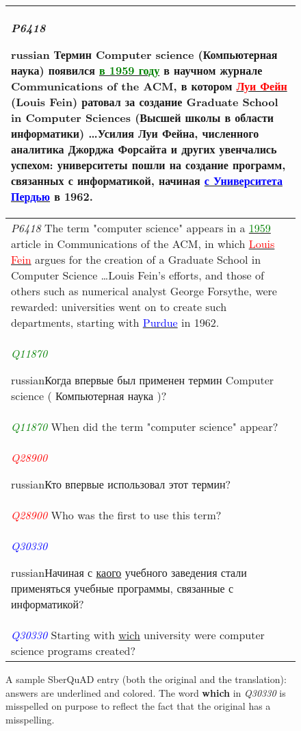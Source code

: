 \begin{figure*}[ht]
\begin{center}
\small
    \begin{tabular}{p{16cm}}
\textit{P6418} \begin{otherlanguage*}{russian} Термин Computer science (Компьютерная наука) появился \underline{\textcolor{green}{в 1959 году}} в научном журнале Communications of the ACM, в котором \underline{\textcolor{red}{Луи Фейн}} (Louis Fein) ратовал за создание Graduate School in Computer Sciences (Высшей школы в области информатики) \ldots Усилия Луи Фейна, численного аналитика Джорджа Форсайта и других увенчались успехом: университеты пошли на создание программ, связанных с информатикой, начиная \underline{\textcolor{blue}{с Университета Пердью}} в 1962. \end{otherlanguage*}   \\\hline
\textit{P6418} The term "computer science" appears in a \underline{\textcolor{green}{1959}} article in Communications of the ACM, 
in which \underline{\textcolor{red}{Louis Fein}} argues for the creation of a Graduate School in Computer Science \ldots   Louis Fein's efforts, and those of others such as numerical analyst George Forsythe, were rewarded: universities went on to create such departments, starting with \underline{\textcolor{blue}{Purdue}} in 1962.
 \\\hline 
\textit{\textcolor{green}{Q11870}} \begin{otherlanguage*}{russian}Когда впервые был применен термин Computer science ( Компьютерная наука )? \end{otherlanguage*}\\
\textit{\textcolor{green}{Q11870}} When did the term "computer science" appear? \\\hline
\textit{\textcolor{red}{Q28900}} \begin{otherlanguage*}{russian}Кто впервые использовал этот термин?\end{otherlanguage*} \\
\textit{\textcolor{red}{Q28900}} Who was the first to use this term? \\\hline
\textit{\textcolor{blue}{Q30330}} \begin{otherlanguage*}{russian}Начиная с \underline{каого} учебного заведения стали применяться учебные программы, связанные с информатикой?\end{otherlanguage*}\\
\textit{\textcolor{blue}{Q30330}} Starting with \underline{wich} university were computer science programs created?\\\hline
\end{tabular}
\end{center}
\caption{\label{fig:examples} A sample SberQuAD entry (both the original and the translation): answers are underlined and colored. 
The word \textbf{which} in \textit{Q30330} is misspelled on purpose to reflect the fact that the original has a misspelling.}
\end{figure*}
